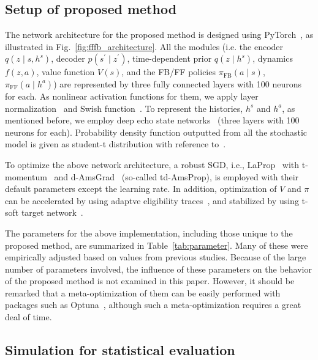 \documentclass{bmcart}
\begin{document}
\subsection{Setup of proposed method}

The network architecture for the proposed method is designed using PyTorch~\cite{paszke2017automatic}, as illustrated in Fig.~\ref{fig:fffb_architecture}.
All the modules (i.e. the encoder $q(z \mid s, h^s)$, decoder $p(s^\prime \mid z^\prime)$, time-dependent prior $q(z \mid h^s)$, dynamics $f(z, a)$, value function $V(s)$, and the FB/FF policies $\pi_\mathrm{FB}(a \mid s)$, $\pi_\mathrm{FF}(a \mid h^a)$) are represented by three fully connected layers with 100 neurons for each.
As nonlinear activation functions for them, we apply layer normalization~\cite{ba2016layer} and Swish function~\cite{elfwing2018sigmoid}.
To represent the histories, $h^s$ and $h^a$, as mentioned before, we employ deep echo state networks~\cite{gallicchio2018design} (three layers with 100 neurons for each).
Probability density function outputted from all the stochastic model is given as student-t distribution with reference to~\cite{takahashi2018student,kobayashi2019variational,kobayashi2019student}.

To optimize the above network architecture, a robust SGD, i.e., LaProp~\cite{ziyin2020laprop} with t-momentum~\cite{ilboudo2020robust} and d-AmsGrad~\cite{kobayashi2021towards} (so-called td-AmsProp), is employed with their default parameters except the learning rate.
In addition, optimization of $V$ and $\pi$ can be accelerated by using adaptve eligibility traces~\cite{kobayashi2020adaptive}, and stabilized by using t-soft target network~\cite{kobayashi2021t}.

The parameters for the above implementation, including those unique to the proposed method, are summarized in Table~\ref{tab:parameter}.
Many of these were empirically adjusted based on values from previous studies.
Because of the large number of parameters involved, the influence of these parameters on the behavior of the proposed method is not examined in this paper.
However, it should be remarked that a meta-optimization of them can be easily performed with packages such as Optuna~\cite{akiba2019optuna}, although such a meta-optimization requires a great deal of time.

\subsection{Simulation for statistical evaluation}
\end{document}
